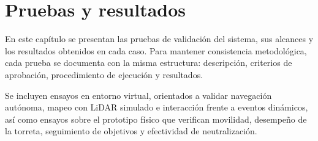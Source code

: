 \chapter{Pruebas y resultados}

\label{Chapter:Pruebas y resultados} 
En este capítulo se presentan las pruebas de validación del sistema, sus alcances y los resultados obtenidos en cada caso. Para mantener consistencia metodológica, cada prueba se documenta con la misma estructura: descripción, criterios de aprobación, procedimiento de ejecución y resultados.

Se incluyen ensayos en entorno virtual, orientados a validar navegación autónoma, mapeo con LiDAR simulado e interacción frente a eventos dinámicos, así como ensayos sobre el prototipo físico que verifican movilidad, desempeño de la torreta, seguimiento de objetivos y efectividad de neutralización.


